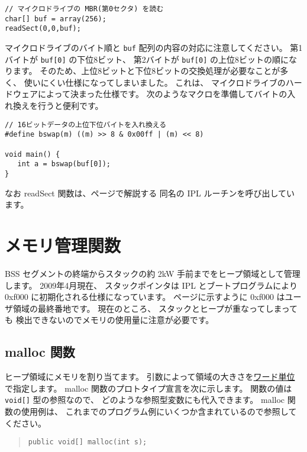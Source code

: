 \begin{mylist}
\begin{verbatim}
// マイクロドライブの MBR(第0セクタ) を読む
char[] buf = array(256);
readSect(0,0,buf);
\end{verbatim}
\end{mylist}

マイクロドライブのバイト順と \verb/buf/ 配列の内容の対応に注意してください。
第1バイトが \verb/buf[0]/ の下位8ビット、
第2バイトが \verb/buf[0]/ の上位8ビットの順になります。
そのため、上位8ビットと下位8ビットの交換処理が必要なことが多く、
使いにくい仕様になってしまいました。
これは、
マイクロドライブのハードウェアによって決まった仕様です。
次のようなマクロを準備してバイトの入れ換えを行うと便利です。

\begin{mylist}
\begin{verbatim}
// 16ビットデータの上位下位バイトを入れ換える
#define bswap(m) ((m) >> 8 & 0x00ff | (m) << 8)

void main() {
   int a = bswap(buf[0]);
}
\end{verbatim}
\end{mylist}

なお readSect 関数は、\pageref{app:ipl}ページで解説する
同名の IPL ルーチンを呼び出しています。

\section{メモリ管理関数}

BSS セグメントの終端からスタックの約 2kW 手前までをヒープ領域として管理します。
2009年4月現在、
スタックポインタは IPL とブートプログラムにより
0xf000 に初期化される仕様になっています。
\pageref{app:memmap}ページに示すように 0xf000 はユーザ領域の最終番地です。
現在のところ、
スタックとヒープが重なってしまっても
検出できないのでメモリの使用量に注意が必要です。

\subsection{malloc 関数}

ヒープ領域にメモリを割り当てます。
引数によって領域の大きさを\underline{ワード単位}で指定します。
malloc 関数のプロトタイプ宣言を次に示します。
関数の値は \verb/void[]/ 型の参照なので、
どのような参照型変数にも代入できます。
malloc 関数の使用例は、
これまでのプログラム例にいくつか含まれているので参照してください。

\begin{quote}
\begin{verbatim}
public void[] malloc(int s);
\end{verbatim}
\end{quote}

